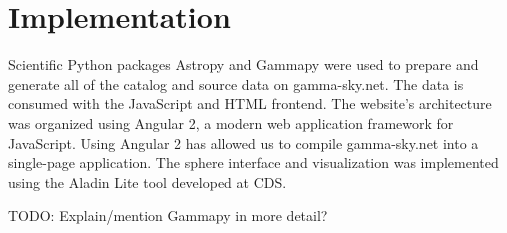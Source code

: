 \section{Implementation}



    Scientific Python packages Astropy and Gammapy \cite{gammapy} were used to prepare and generate all of the catalog and source data on gamma-sky.net. The data is consumed with the JavaScript and HTML frontend. The website's architecture was organized using Angular 2, a modern web application framework for JavaScript. Using Angular 2 has allowed us to compile gamma-sky.net into a single-page application. The sphere interface and visualization was implemented using the Aladin Lite tool \cite{aladin-lite} developed at CDS.


    TODO: Explain/mention Gammapy in more detail?
